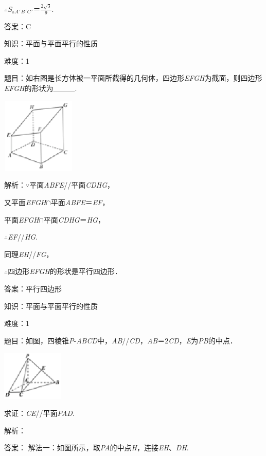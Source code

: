 \documentclass{article} %
\begin{document}
$\mathrm{\therefore}$\textit{S}${}_{\vartriangle }$\textit{${}_{A}$}${}_{\mathrm{\prime }}$\textit{${}_{B}$}${}_{\mathrm{\prime }}$\textit{${}_{C}$}${}_{\mathrm{\prime }}$＝$\frac{2\sqrt3}{9}$.

答案：C

知识：平面与平面平行的性质

难度：1

题目：如右图是长方体被一平面所截得的几何体，四边形\textit{EFGH}为截面，则四边形\textit{EFGH}的形状为\_\_\_\_.

\includegraphics*[width=1.38in, height=1.42in, keepaspectratio=false]{image178}

解析：$\mathrm{\because}$平面\textit{ABFE}//平面\textit{CDHG}，

又平面\textit{EFGH}$\mathrm{\cap}$平面\textit{ABFE}＝\textit{EF}，

平面\textit{EFGH}$\mathrm{\cap}$平面\textit{CDHG}＝\textit{HG}，

$\mathrm{\therefore}$\textit{EF}//\textit{HG}.

同理\textit{EH}//\textit{FG}，

$\mathrm{\therefore}$四边形\textit{EFGH}的形状是平行四边形．

答案：平行四边形

知识：平面与平面平行的性质

难度：1

题目：如图，四棱锥\textit{P}-\textit{ABCD}中，\textit{AB}//\textit{CD}，\textit{AB}＝2\textit{CD}，\textit{E}为\textit{PB}的中点．

\includegraphics*[width=1.16in, height=0.93in, keepaspectratio=false]{image179}

求证：\textit{CE}//平面\textit{PAD}.

解析：

答案：
解法一：如图所示，取\textit{PA}的中点\textit{H}，连接\textit{EH}、\textit{DH}.
\end{document}
